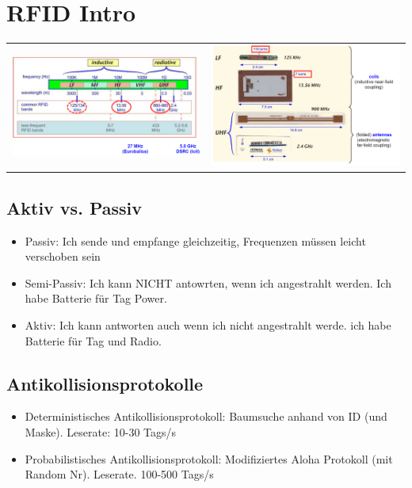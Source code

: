 
\section{RFID Intro}
\begin{tabular}[h]{c c}

\parbox{6cm}{
    \includegraphics[width=8cm]{./bilder/RFIDFrequenzen.png} } 
&

\parbox{6cm}{
    \includegraphics[width=8cm]{./bilder/RFIDTags.png} } \\
\end{tabular}
\subsection{Aktiv vs. Passiv}
	\begin{itemize}
		\item Passiv: Ich sende und empfange gleichzeitig, Frequenzen müssen leicht verschoben sein
		\item Semi-Passiv: Ich kann NICHT antowrten, wenn ich angestrahlt werden. Ich habe Batterie für Tag Power. 
		\item Aktiv: Ich kann antworten auch wenn ich nicht angestrahlt werde. ich habe Batterie für Tag und Radio. 
	\end{itemize}
\subsection{Antikollisionsprotokolle}
	\begin{itemize}
		 \item Deterministisches Antikollisionsprotokoll: Baumsuche anhand von ID (und Maske). Leserate: 10-30 Tags/s
		 \item Probabilistisches Antikollisionsprotokoll: Modifiziertes Aloha Protokoll (mit Random Nr). Leserate. 100-500 Tags/s
	\end{itemize}
